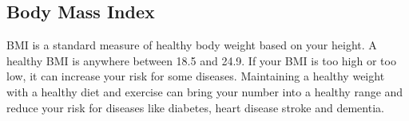 \subsection{Body Mass Index}

BMI is a standard measure of healthy body weight based on your height. A healthy BMI is anywhere between 18.5 and 24.9. If your BMI is too high or too low, it can increase your risk for some diseases. Maintaining a healthy weight with a healthy diet and exercise can bring your number into a healthy range and reduce your risk for diseases like diabetes, heart disease stroke and dementia.